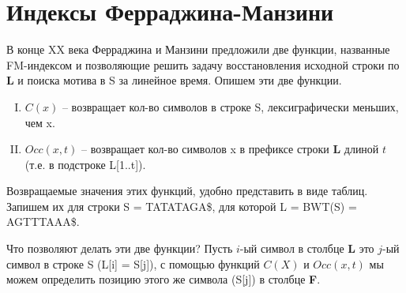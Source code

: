 \documentclass[letterpaper, 11pt]{article}
\begin{document}
\section{Индексы Ферраджина-Манзини}

В конце XX века Ферраджина и Манзини предложили две функции, названные FM-индексом и позволяющие решить задачу восстановления исходной строки по \textbf{L} и поиска мотива в S за линейное время. Опишем эти две функции.
\begin{enumerate}[I.]
\item
$C(x)$ -- возвращает кол-во символов в строке S, лексиграфически меньших, чем x.
\item
$Occ(x, t)$ -- возвращает кол-во символов x в префиксе строки \textbf{L} длиной $t$ (т.е. в подстроке L[1..t]).
\end{enumerate}

Возвращаемые значения этих функций, удобно представить в виде таблиц. Запишем их для строки S = TATATAGA\$, для которой L = BWT(S) = AGTTTAAA\$.

\begin{table}[H]
\caption{$C(x)$}
\end{table}

\begin{table}[H]
\caption{$Occ(x, t)$}
\end{table}

Что позволяют делать эти две функции? Пусть $i$-ый символ в столбце \textbf{L} это $j$-ый символ в строке S (L[i] = S[j]), с помощью функций $C(X)$ и $Occ(x, t)$ мы можем определить позицию этого же символа (S[j]) в столбце \textbf{F}. 
\end{document}
